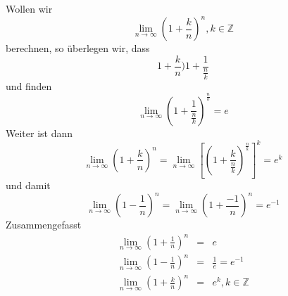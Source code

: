 \documentclass{report}
\begin{document}
Wollen wir
\begin{equation}\lim_{n \to \infty} ( 1 + \frac{k}{n})^n, k \in \mathbb{Z}\end{equation}
berechnen, so überlegen wir, dass
\begin{equation}1 + \frac{k}{n} ) 1 + \frac{1}{\frac{n}{k}}\end{equation}
und finden
\begin{equation}\lim_{n \to \infty} ( 1 + \frac{1}{\frac{n}{k}})^\frac{n}{k} = e\end{equation}
Weiter ist dann
\begin{equation}\lim_{n \to \infty} (1 + \frac{k}{n})^n = \lim_{n \to \infty}[(1 + \frac{k}{\frac{n}{k}})^\frac{n}{k}]^k = e^k\end{equation}
und damit
\begin{equation}\lim_{n \to \infty} (1 - \frac{1}{n})^n = \lim_{n \to \infty} (1 + \frac{-1}{n})^n = e^{-1}\end{equation}
Zusammengefasst
\begin{eqnarray}\lim_{n \to \infty} (1 + \frac{1}{n})^n & = & e\\
\lim_{n \to \infty} (1 - \frac{1}{n})^n & = & \frac{1}{e} = e^{-1}\\
\lim_{n \to \infty} (1 + \frac{k}{n})^n & = & e^k, k \in \mathbb{Z}\end{eqnarray}
\end{document}

